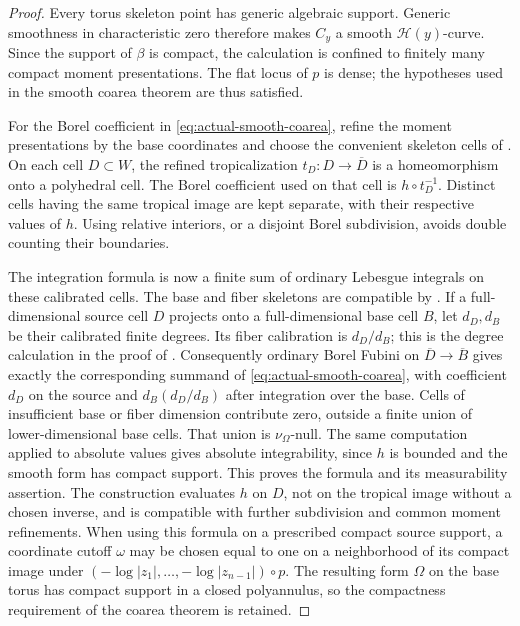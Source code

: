 \documentclass[11pt,reqno]{amsart}
\theoremstyle{definition}
\theoremstyle{remark}
\numberwithin{equation}{section}
\begin{document}
\begin{proof}
Every torus skeleton point has generic algebraic support. Generic
smoothness in characteristic zero therefore makes $C_y$ a smooth
$\mathscr H(y)$-curve. Since the support of $\beta$ is compact, the
calculation is confined to finitely many compact moment presentations.
The flat locus of $p$ is dense; the hypotheses used in the smooth
coarea theorem \cite[Theorem~16.5.4]{CLD25} are thus satisfied.

For the Borel coefficient in \eqref{eq:actual-smooth-coarea}, refine
the moment presentations by the
base coordinates and choose the convenient skeleton cells of
\cite[Lemma~14.1.5]{CLD25}. On each cell $D\subset W$,
the refined tropicalization $t_D:D\to\overline D$ is a homeomorphism
onto a polyhedral cell. The Borel coefficient used on that cell is
$h\circ t_D^{-1}$. Distinct cells having the same tropical image are
kept separate, with their respective values of $h$. Using relative
interiors, or a disjoint Borel subdivision,
avoids double counting their boundaries.

The integration formula is now a finite sum of ordinary Lebesgue
integrals on these calibrated cells. The base and fiber skeletons are
compatible by \cite[Lemma~14.2.10]{CLD25}. If a full-dimensional source
cell $D$ projects onto a full-dimensional base cell $B$, let $d_D,d_B$
be their calibrated finite degrees. Its fiber calibration is $d_D/d_B$;
this is the degree calculation in the proof of
\cite[Theorem~16.5.4]{CLD25}. Consequently ordinary Borel Fubini on
$\overline D\to\overline B$ gives exactly the corresponding summand
of \eqref{eq:actual-smooth-coarea}, with coefficient $d_D$ on the
source and $d_B(d_D/d_B)$ after integration over the base. Cells of
insufficient base or fiber dimension contribute zero, outside a
finite union of lower-dimensional base cells. That union is
$\nu_\Omega$-null. The same computation applied to absolute values
gives absolute integrability, since $h$ is bounded and the smooth
form has compact support. This proves the formula and its
measurability assertion. The construction evaluates $h$ on $D$, not
on the tropical image without a chosen inverse, and is compatible with further
subdivision and common moment refinements.
When using this formula on a prescribed compact source support, a
coordinate cutoff $\omega$ may be chosen equal to one on a neighborhood
of its compact image under $(-\log|z_1|,\ldots,-\log|z_{n-1}|)\circ p$.
The resulting form $\Omega$ on the base torus has compact support in
a closed polyannulus, so the compactness requirement of the coarea theorem is
retained.
\end{proof}
\end{document}
